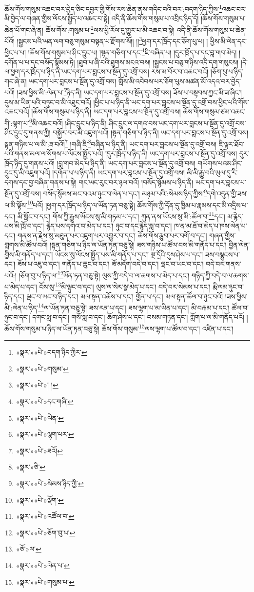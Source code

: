 ཆོས་གོས་གསུམ་འཆང་བར་བྱེད་ཅིང་དབྱར་གྱི་གོས་རས་ཆེན་ནས་གདིང་བའི་བར་:བདག་ཉིད་ཀྱིས་\footnote{«སྣར་»«པེ་»བདག་ཉིད་ཀྱིར་}འཆང་བར་མི་བྱེད་ལ་གཞན་གྱིས་ལོངས་སྤྱོད་པ་འཆང་བ་སྟེ། འདི་ནི་ཆོས་གོས་གསུམ་པ་འབྲིང་ཉིད་དོ། །ཆོས་གོས་གསུམ་པ་ཆེན་པོ་གང་ཞེ་ན། ཆོས་གོས་:གསུམ་པ་\footnote{«སྣར་»«པེ་»གསུམ་}ལས་ཕྱི་རོལ་དུ་གྱུར་པ་མི་འཆང་བ་སྟེ། འདི་ནི་ཆོས་གོས་གསུམ་པ་ཆེན་པོའོ། །སྦྱངས་པའི་ཡན་ལག་བཅུ་གསུམ་བསྟན་པ་རྫོགས་སོ།། །།\footnote{«སྣར་»«པེ་»། །}ཕྱག་དར་ཁྲོད་དང་ཅོག་པུ་པ། །
ཕྱིས་མི་ལེན་དང་ཕྱིང་པ་པ། །ཆོས་གོས་གསུམ་པ་ཤིང་དྲུང་པ། །སྟན་གཅིག་པ་དང་\footnote{«སྣར་»«པེ་»དང་གཞི་}ཇི་བཞིན་པ། །དུར་ཁྲོད་པ་དང་བླ་གབ་མེད། །དགོན་པ་པ་དང་བསོད་སྙོམས་ཏེ། །ཐུབ་པ་ཞི་བའི་ཐུགས་མངའ་བས། །སྦྱངས་པ་བཅུ་གཉིས་འདི་དག་གསུངས། །དེ་ལ་ཕྱག་དར་ཁྲོད་པ་ཉིད་ནི་ཡང་དག་པར་བླངས་པ་སྔོན་དུ་འགྲོ་བས། རས་མ་བོར་བ་འཆང་བའོ། །ཅོག་པུ་པ་ཉིད་གང་ཞེ་ན། ཡང་དག་པར་བླངས་པ་སྔོན་དུ་འགྲོ་བས། གློས་མི་འབེབས་པར་ཅོག་པུས་མཚན་མོ་འདའ་བར་བྱེད་པའོ། །ཟས་ཕྱིས་མི་:ལེན་པ་\footnote{«སྣར་»«པེ་»ལེན་}ཉིད་ནི། ཡང་དག་པར་བླངས་པ་སྔོན་དུ་འགྲོ་བས། ཟོས་པ་བསྟབས་ཀྱང་མི་ཟ་ཞིང་། དུས་མ་ཡིན་པའི་བཏུང་བ་མི་འཐུང་བའོ། །ཕྱིང་པ་པ་ཉིད་ནི་ཡང་དག་པར་བླངས་པ་སྔོན་དུ་འགྲོ་བས་ཕྱིང་པའི་གོས་འཆང་བའོ། །ཆོས་གོས་གསུམ་པ་ཉིད་ནི། ཡང་དག་པར་བླངས་པ་སྔོན་དུ་འགྲོ་བས། ཆོས་གོས་གསུམ་ཙམ་འཆང་གི་:ལྷག་པ་\footnote{«སྣར་»«པེ་»ལྷག་པར་}མི་འཆང་བའོ། །ཤིང་དྲུང་པ་ཉིད་ནི། ཤིང་དྲུང་ལ་དགའ་བས་ཡང་དག་པར་བླངས་པ་སྔོན་དུ་འགྲོ་བས་ཤིང་དྲུང་དུ་གནས་ཀྱི། བསྐྱོར་བར་མི་འཇུག་པའོ། །སྟན་གཅིག་པ་ཉིད་ནི། ཡང་དག་པར་བླངས་པ་སྔོན་དུ་འགྲོ་བས། སྟན་གཉིས་པ་ལ་མི་:ཟ་བའོ།\footnote{«སྣར་»«པེ་»ཟའོ།} །གཞི་ཇི་\footnote{«སྣར་»ཅི་}བཞིན་པ་ཉིད་ནི། ཡང་དག་པར་བླངས་པ་སྔོན་དུ་འགྲོ་བས། ཇི་ལྟར་ཐོབ་པའི་གནས་མལ་ལ་སོགས་པ་ལོངས་སྤྱོད་པའོ། །དུར་ཁྲོད་པ་ཉིད་ནི། ཡང་དག་པར་བླངས་པ་སྔོན་དུ་འགྲོ་བས། དུར་ཁྲོད་ཉིད་དུ་གནས་པའོ། །བླ་གབ་མེད་པ་ཉིད་ནི། ཡང་དག་པར་བླངས་པ་སྔོན་དུ་འགྲོ་བས། གཡོགས་པའམ་ཤིང་དྲུང་དུ་མི་འཇུག་པའོ། །དགོན་པ་པ་ཉིད་ནི། ཡང་དག་པར་བླངས་པ་སྔོན་དུ་འགྲོ་བས། མི་མི་རྒྱུ་བའི་ཡུལ་དུ་རི་དགས་དང་བྱ་བཞིན་གནས་པ་སྟེ། གང་ཡང་རུང་བར་ཉལ་བའོ། །བསོད་སྙོམས་པ་ཉིད་ནི། ཡང་དག་པར་བླངས་པ་སྔོན་དུ་འགྲོ་བས། བསོད་སྙོམས་མང་བའམ་ཉུང་བ་ལེན་པ་དང་། མཉམ་པའི་:སེམས་ཉིད་ཀྱིས་\footnote{«སྣར་»«པེ་»སེམས་ཉིད་ཀྱི་}དགེ་འདུན་གྱི་ཟས་ལ་མི་ལྟོས་\footnote{«སྣར་»«པེ་»ལྡོག་}པའོ། །ཕྱག་དར་ཁྲོད་པ་ཉིད་ལ་ཡོན་ཏན་བཅུ་སྟེ། ཆོས་གོས་ཀྱི་དོན་དུ་ཁྱིམ་པ་རྣམས་དང་མི་འདྲིས་པ་དང་། མི་སློང་བ་དང་། གོས་ཀྱི་རྒྱུས་ཡོངས་སུ་མི་གཏམ་པ་དང་། ཀུན་ནས་ཡོངས་སུ་མི་:ཚོལ་བ་\footnote{«སྣར་»«པེ་»འཚོལ་བ་}དང་། མ་རྙེད་པས་མི་ཁྲོ་བ་དང་། རྙེད་པས་དགའ་བ་མེད་པ་དང་། ཉུང་བ་དང་རྙེད་སླ་བ་དང་། ཁ་ན་མ་ཐོ་བ་མེད་པ་ཁས་ལེན་པ་དང་། གནས་ན་རྗེས་སུ་མཐུན་པར་འཇུག་པར་འགྱུར་བ་དང་། ཆོས་གོས་རྩུབ་པར་བགོ་བ་དང་། གཞན་གྱིས་གླགས་མི་ཚོལ་བའོ། །སྟན་གཅིག་པ་ཉིད་ལ་ཡོན་ཏན་བཅུ་སྟེ། ཟས་གཉིས་པ་ཚོལ་བས་མི་གནོད་པ་དང་། བྱིན་ལེན་གྱིས་མི་གནོད་པ་དང་། ཡོངས་སུ་ལོངས་སྤྱོད་པས་མི་གནོད་པ་དང་། སྔ་དྲོའི་དུས་ཤེས་པ་དང་། ཟས་བསྙུངས་པ་དང་། ཟོས་པ་འཇུ་བ་དང་། གནོད་པ་ཆུང་བ་དང་། ཟོ་མདོག་བདེ་བ་དང་། ལྡང་བ་ཡང་བ་དང་། བདེ་བར་གནས་པའོ:། །ཅོག་བུ་པ་ཉིད་ལ་\footnote{«སྣར་»«པེ་»ཅོག་བུ་པ་}ཡོན་ཏན་བཅུ་སྟེ། ལུས་ཀྱི་བདེ་བ་ལ་ཆགས་པ་མེད་པ་དང་། གཉིད་ཀྱི་བདེ་བ་ལ་ཆགས་པ་མེད་པ་དང་། ངོས་སུ་\footnote{«ཅོ་»ལ་}མི་ལྟུང་བ་དང་། ལུས་ལ་སེར་སྣ་མེད་པ་དང་། བདེ་བར་སེམས་པ་དང་། རྨི་ལམ་ཉུང་བ་ཉིད་དང་། ལྡང་བ་ཡང་བ་ཉིད་དང་། མལ་སྟན་འཆོས་པ་དང་། གྱོན་པ་དང་། མལ་སྟན་ཚོལ་བ་ཉུང་བའོ། །ཟས་ཕྱིས་མི་:ལེན་པ་ཉིད་\footnote{«སྣར་»«པེ་»ལེན་པ་}ལ་ཡོན་ཏན་བཅུ་སྟེ། ཟས་རན་པ་དང་། ཟས་ལྷག་པ་མ་ཡིན་པ་དང་། མི་བརྐམ་པ་དང་། ཚོལ་བ་ཉུང་བ་དང་། དགང་སླ་བ་དང་། གསོ་སླ་བ་དང་། ཆོག་ཤེས་པ་དང་། བསམ་གཏན་དང་། ཀློག་པ་ལ་མི་གནོད་པའོ། །ཆོས་གོས་གསུམ་པ་ཉིད་ལ་ཡོན་ཏན་བཅུ་སྟེ། ཆོས་གོས་གསུམ་\footnote{«སྣར་»«པེ་»གསུམ་པ་}ལས་ལྷག་པ་ཚོལ་བ་དང་། འཛིན་པ་དང་། 